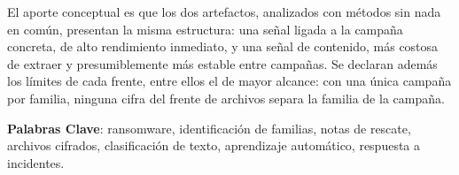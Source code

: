 \vspace{0.3cm}

\noindent
El aporte conceptual es que los dos artefactos, analizados con métodos sin nada en común, presentan la misma estructura: una señal ligada a la campaña concreta, de alto rendimiento inmediato, y una señal de contenido, más costosa de extraer y presumiblemente más estable entre campañas. Se declaran además los límites de cada frente, entre ellos el de mayor alcance: con una única campaña por familia, ninguna cifra del frente de archivos separa la familia de la campaña.

\vspace{0.5cm}

\noindent
\textbf{Palabras Clave}: ransomware, identificación de familias, notas de rescate, archivos cifrados, clasificación de texto, aprendizaje automático, respuesta a incidentes.
